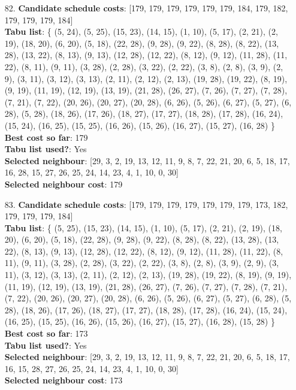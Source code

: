 \documentclass[fleqn]{article}
\begin{document}
\begin{itemize}
    \item[82.] \textbf{Candidate schedule costs}: [179, 179, 179, 179, 179, 179, 184, 179, 182, 179, 179, 179, 184] \\
    \textbf{Tabu list}: \{ (5, 24), (5, 25), (15, 23), (14, 15), (1, 10), (5, 17), (2, 21), (2, 19), (18, 20), (6, 20), (5, 18), (22, 28), (9, 28), (9, 22), (8, 28), (8, 22), (13, 28), (13, 22), (8, 13), (9, 13), (12, 28), (12, 22), (8, 12), (9, 12), (11, 28), (11, 22), (8, 11), (9, 11), (3, 28), (2, 28), (3, 22), (2, 22), (3, 8), (2, 8), (3, 9), (2, 9), (3, 11), (3, 12), (3, 13), (2, 11), (2, 12), (2, 13), (19, 28), (19, 22), (8, 19), (9, 19), (11, 19), (12, 19), (13, 19), (21, 28), (26, 27), (7, 26), (7, 27), (7, 28), (7, 21), (7, 22), (20, 26), (20, 27), (20, 28), (6, 26), (5, 26), (6, 27), (5, 27), (6, 28), (5, 28), (18, 26), (17, 26), (18, 27), (17, 27), (18, 28), (17, 28), (16, 24), (15, 24), (16, 25), (15, 25), (16, 26), (15, 26), (16, 27), (15, 27), (16, 28) \} \\
    \textbf{Best cost so far}: 179 \\
    \textbf{Tabu list used?}: Yes \\
    \textbf{Selected neighbour}: [29, 3, 2, 19, 13, 12, 11, 9, 8, 7, 22, 21, 20, 6, 5, 18, 17, 16, 28, 15, 27, 26, 25, 24, 14, 23, 4, 1, 10, 0, 30] \\
    \textbf{Selected neighbour cost}: 179
      

    \item[83.] \textbf{Candidate schedule costs}: [179, 179, 179, 179, 179, 179, 179, 173, 182, 179, 179, 179, 184] \\
    \textbf{Tabu list}: \{ (5, 25), (15, 23), (14, 15), (1, 10), (5, 17), (2, 21), (2, 19), (18, 20), (6, 20), (5, 18), (22, 28), (9, 28), (9, 22), (8, 28), (8, 22), (13, 28), (13, 22), (8, 13), (9, 13), (12, 28), (12, 22), (8, 12), (9, 12), (11, 28), (11, 22), (8, 11), (9, 11), (3, 28), (2, 28), (3, 22), (2, 22), (3, 8), (2, 8), (3, 9), (2, 9), (3, 11), (3, 12), (3, 13), (2, 11), (2, 12), (2, 13), (19, 28), (19, 22), (8, 19), (9, 19), (11, 19), (12, 19), (13, 19), (21, 28), (26, 27), (7, 26), (7, 27), (7, 28), (7, 21), (7, 22), (20, 26), (20, 27), (20, 28), (6, 26), (5, 26), (6, 27), (5, 27), (6, 28), (5, 28), (18, 26), (17, 26), (18, 27), (17, 27), (18, 28), (17, 28), (16, 24), (15, 24), (16, 25), (15, 25), (16, 26), (15, 26), (16, 27), (15, 27), (16, 28), (15, 28) \} \\
    \textbf{Best cost so far}: 173 \\
    \textbf{Tabu list used?}: Yes \\
    \textbf{Selected neighbour}: [29, 3, 2, 19, 13, 12, 11, 9, 8, 7, 22, 21, 20, 6, 5, 18, 17, 16, 15, 28, 27, 26, 25, 24, 14, 23, 4, 1, 10, 0, 30] \\
    \textbf{Selected neighbour cost}: 173
      


\end{itemize}
\end{document}
